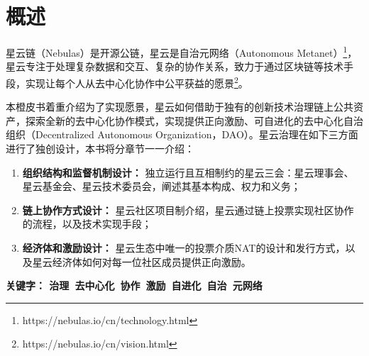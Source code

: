 \section{概述}

星云链（Nebulas）是开源公链，星云是自治元网络（Autonomous Metanet）\footnote{https://nebulas.io/cn/technology.html}，星云专注于处理复杂数据和交互、复杂的协作关系，致力于通过区块链等技术手段，实现让每个人从去中心化协作中公平获益的愿景\footnote{https://nebulas.io/cn/vision.html}。

本橙皮书着重介绍为了实现愿景，星云如何借助于独有的创新技术治理链上公共资产，探索全新的去中心化协作模式，实现提供正向激励、可自进化的去中心化自治组织（Decentralized Autonomous Organization，DAO）。星云治理在如下三方面进行了独创设计，本书将分章节一一介绍：

\begin{enumerate}
	\item \textbf{组织结构和监督机制设计：}
	独立运行且互相制约的星云三会：星云理事会、星云基金会、星云技术委员会，阐述其基本构成、权力和义务；
	\item \textbf{链上协作方式设计：}
	星云社区项目制介绍，星云通过链上投票实现社区协作的流程，以及技术实现手段；
	\item \textbf{经济体和激励设计：}
	星云生态中唯一的投票介质NAT的设计和发行方式，以及星云经济体如何对每一位社区成员提供正向激励。
\end{enumerate}

\textbf{关键字： 治理\ 去中心化\ 协作\ 激励\ 自进化\ 自治\ 元网络 }